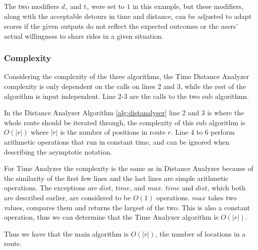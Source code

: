 The two modifiers $d_\gamma$ and $t_\gamma$ were set to $1$ in this example, but these modifiers, along with the acceptable detours in time and distance, can be adjusted to adapt scores if the given outputs do not reflect the expected outcomes or the users' actual willingness to share rides in a given situation. 

\subsubsection{Complexity}
Considering the complexity of the three algorithms, the Time Distance Analyzer complexity is only dependent on the calls on lines 2 and 3, while the rest of the algorithm is input independent.
Line 2-3 are the calls to the two sub algorithms.

In the Distance Analyzer Algorithm \ref{alg:distanalyser} line 2 and 3 is where the whole route should be iterated through, the complexity of this sub algorithm is $O(|r|)$ where $|r|$ is the number of positions in route $r$.
Line 4 to 6 perform arithmetic operations that run in constant time, and can be ignored when describing the asymptotic notation.

For Time Analyzer the complexity is the same as in Distance Analyzer because of the similarity of the first few lines and the last lines are simple arithmetic operations. 
The exceptions are $dist$, $time$, and $max$. 
$time$ and $dist$, which both are described earlier, are considered to be $O(1)$ operations.
$max$ takes two values, compares them and returns the largest of the two.
This is also a constant operation, thus we can determine that the Time Analyzer algorithm is $O(|r|)$.

Thus we have that the main algorithm is $O(|r|)$, the number of locations in a route.